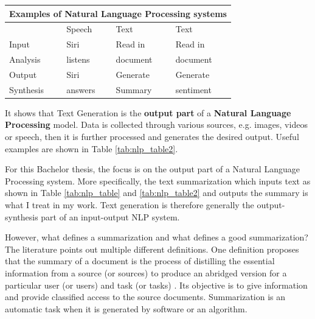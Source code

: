 \begin{center} 
	\begin{tabular}{ |p{3cm}||p{3cm}|p{3cm}|p{3cm}|}
		\hline
		\multicolumn{4}{|c|}{\textbf{Examples of Natural Language Processing systems}}\\ \hline\hline
		&Speech &Text &Text \\ \hline
		Input &Siri &Read in &Read in \\
		Analysis &listens  &document     &document \\ \hline \hline
		Output &Siri &\cellcolor[HTML]{F3E687}Generate &Generate \\
		Synthesis &answers & \cellcolor[HTML]{F3E687}Summary &sentiment \\ \hline
	\end{tabular}
	\label{tab:nlp_table2}
\end{center}

It shows that Text Generation is the \textbf{output part} of a \textbf{Natural Language Processing} model. Data is collected through various sources, e.g. images, videos or speech, then it is further processed and generates the desired output. Useful examples are shown in Table \ref{tab:nlp_table2}.

For this Bachelor thesis, the focus is on the output part of a Natural Language Processing system. More specifically, the text summarization which inputs text as shown in Table \ref{tab:nlp_table} and \ref{tab:nlp_table2} and outputs the summary is what I treat in my work. Text generation is therefore generally the output-synthesis part of an input-output NLP system.

However, what defines a summarization and what defines a good summarization? The literature points out multiple different definitions. One definition proposes that the summary of a document is the process of distilling the essential information from a source (or sources) to produce an abridged version for a particular user (or users) and task (or tasks) \cite{def}. Its objective is to give information and provide classified access to the source documents. Summarization is an automatic task when it is generated by software or an algorithm.

